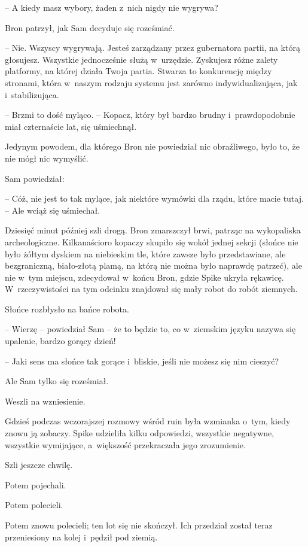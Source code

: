 \documentclass[oneside,polish,11pt,rmheadings]{mwbk}
\begin{document}
-- A kiedy masz wybory, żaden z~nich nigdy nie wygrywa? 

Bron patrzył, jak Sam decyduje się roześmiać. 

-- Nie. Wszyscy wygrywają. Jesteś zarządzany przez gubernatora partii, na którą głosujesz. Wszystkie jednocześnie służą w~urzędzie. Zyskujesz różne zalety platformy, na której działa Twoja partia. Stwarza to konkurencję między stronami, która w~naszym rodzaju systemu jest zarówno indywidualizująca, jak i~stabilizująca. 

-- Brzmi to dość myląco. -- Kopacz, który był bardzo brudny i~prawdopodobnie miał czternaście lat, się uśmiechnął. 

Jedynym powodem, dla którego Bron nie powiedział nic obraźliwego, było to, że nie mógł nic wymyślić. 

Sam powiedział: 

-- Cóż, nie jest to tak mylące, jak niektóre wymówki dla rządu, które macie tutaj. -- Ale wciąż się uśmiechał.  

Dziesięć minut później szli drogą. Bron zmarszczył brwi, patrząc na wykopaliska archeologiczne. Kilkanaścioro kopaczy skupiło się wokół jednej sekcji (słońce nie było żółtym dyskiem na niebieskim tle, które zawsze było przedstawiane, ale bezgraniczną, biało-złotą plamą, na którą nie można było naprawdę patrzeć), ale nie w~tym miejscu, zdecydował w~końcu Bron, gdzie Spike ukryła rękawicę. W~rzeczywistości na tym odcinku znajdował się mały robot do robót ziemnych. 

Słońce rozbłysło na bańce robota. 

-- Wierzę -- powiedział Sam -- że to będzie to, co w~ziemskim języku nazywa się upalenie, bardzo gorący dzień! 

-- Jaki sens ma słońce tak gorące i~bliskie, jeśli nie możesz się nim cieszyć? 

Ale Sam tylko się roześmiał. 

Weszli na wzniesienie. 

Gdzieś podczas wczorajszej rozmowy wśród ruin była wzmianka o~tym, kiedy znowu ją zobaczy. Spike udzieliła kilku odpowiedzi, wszystkie negatywne, wszystkie wymijające, a~większość przekraczała jego zrozumienie. 

Szli jeszcze chwilę. 

Potem pojechali. 

Potem polecieli. 

Potem znowu polecieli; ten lot się nie skończył. Ich przedział został teraz przeniesiony na kolej i~pędził pod ziemią. 
\end{document}
